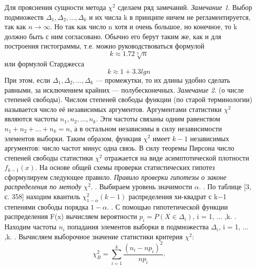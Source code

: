 Для прояснения сущности метода $\chi^{2}$ сделаем ряд замечаний.
\newline
\textit{Замечание 1}. Выбор подмножеств $\Delta_{1},\Delta_{2}, ... ,\Delta_{k}$ и их числа k в принципе ничем не регламентируется, так как $n \rightarrow \infty$. Но так как число n хотя и очень большое, но конечное, то k должно быть с ним согласовано. Обычно его берут таким же, как и для построения гистограммы, т.е. можно руководствоваться формулой
\begin{equation}
k \approx 1.72\sqrt[3]{n}
\label{k_1}
\end{equation}
или формулой Старджесса
\begin{equation}
k \approx 1 + 3.3lgn
\end{equation}
При этом, если  $\Delta_{1},\Delta_{2}, ... ,\Delta_{k}$ — промежутки, то их длины удобно сделать равными, за исключением крайних — полубесконечных.
\newline
\textit{Замечание 2}. (о числе степеней свободы).
Числом степеней свободы функции (по старой терминологии) называется число её независимых аргументов. Аргументами статистики $\chi^{2}$ являются частоты $n_{1},n_{2}, ... ,n_{k}$. Эти частоты связаны одним равенством $n_{1} + n_{2} + ... + n_{k}  = n$, а в остальном независимы в силу независимости элементов выборки. Таким образом, функция $\chi^{2}$  имеет $k-1$ независимых аргументов: число частот минус одна связь. В силу теоремы Пирсона число степеней свободы статистики $\chi^{2}$  отражается на виде асимптотической плотности $f_{k - 1}(x)$.
\newline
На основе общей схемы проверки статистических гипотез сформулируем следующее правило.
\newline
\textit{Правило проверки гипотезы о законе распределения по методу $\chi^{2}$}.
. Выбираем уровень значимости $\alpha$.
. По таблице [3, с. 358] находим квантиль $\chi^{2}_{1-\alpha}(k - 1)$ распределения хи-квадрат с k$-$1 степенями свободы порядка $1-\alpha$. 
. С помощью гипотетической функции распределения F(x) вычисляем вероятности $p_{i} = P (X \in \Delta_{i})$, i = 1, ... ,k.
. Находим частоты $n_{i}$ попадания элементов выборки в подмножества $\Delta_{i}$, i = 1, ... ,k. 
. Вычисляем выборочное значение статистики критерия $\chi^{2}$:
\begin{equation}
\chi^{2}_{B} =\sum_{i = 1}^{k}{\frac{(n_{i} - np_{i})^{2}}{np_{i}}}.
\label{chi_B}
\end{equation}
